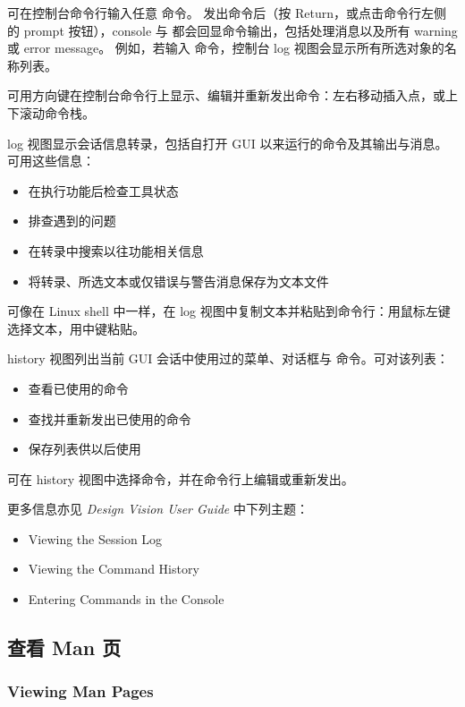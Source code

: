 可在控制台命令行输入任意  命令。
发出命令后（按 Return，或点击命令行左侧的 prompt 按钮），console 与  都会回显命令输出，包括处理消息以及所有 warning 或 error message。
例如，若输入  命令，控制台 log 视图会显示所有所选对象的名称列表。

可用方向键在控制台命令行上显示、编辑并重新发出命令：左右移动插入点，或上下滚动命令栈。

log 视图显示会话信息转录，包括自打开 GUI 以来运行的命令及其输出与消息。可用这些信息：
\begin{itemize}
  \item 在执行功能后检查工具状态
  \item 排查遇到的问题
  \item 在转录中搜索以往功能相关信息
  \item 将转录、所选文本或仅错误与警告消息保存为文本文件
\end{itemize}

可像在 Linux shell 中一样，在 log 视图中复制文本并粘贴到命令行：用鼠标左键选择文本，用中键粘贴。

history 视图列出当前 GUI 会话中使用过的菜单、对话框与  命令。可对该列表：
\begin{itemize}
  \item 查看已使用的命令
  \item 查找并重新发出已使用的命令
  \item 保存列表供以后使用
\end{itemize}

可在 history 视图中选择命令，并在命令行上编辑或重新发出。

更多信息亦见 \textit{Design Vision User Guide} 中下列主题：
\begin{itemize}
  \item Viewing the Session Log
  \item Viewing the Command History
  \item Entering Commands in the Console
\end{itemize}

\subsection{查看 Man 页}
\subsubsection*{Viewing Man Pages}

